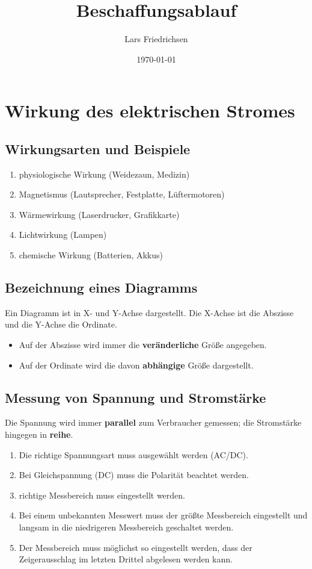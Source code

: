\documentclass[a4paper,11pt]{scrartcl}	%
\title{Beschaffungsablauf}
\author{Lars Friedrichsen}
\date{\today}
\begin{document}
\section{Wirkung des elektrischen Stromes}


	\subsection{Wirkungsarten und Beispiele}

		\begin{enumerate}
			\item physiologische Wirkung (Weidezaun, Medizin)
			\item Magnetismus (Lautsprecher, Festplatte, Lüftermotoren)
			\item Wärmewirkung (Laserdrucker, Grafikkarte)
			\item Lichtwirkung (Lampen)
			\item chemische Wirkung (Batterien, Akkus)
		\end{enumerate}
			
	\subsection{Bezeichnung eines Diagramms}
	
	Ein Diagramm ist in X- und Y-Achse dargestellt. Die X-Achse ist die Abszisse und die Y-Achse die Ordinate.
		\begin{itemize}
			\item Auf der Abszisse wird immer die \textbf{veränderliche} Größe angegeben.
			\item Auf der Ordinate wird die davon \textbf{abhängige} Größe dargestellt.
		\end{itemize}
		
	\subsection{Messung von Spannung und Stromstärke}
	
	Die Spannung wird immer \textbf{parallel} zum Verbraucher gemessen; die Stromstärke hingegen in \textbf{reihe}.
		
		\begin{enumerate}
			\item{Die richtige Spannungsart muss ausgewählt werden (AC/DC).}
    		\item{Bei Gleichspannung (DC) muss die Polarität beachtet werden.}
    		\item{richtige Messbereich muss eingestellt werden.}
    		\item{Bei einem unbekannten Messwert muss der größte Messbereich eingestellt und langsam in die niedrigeren Messbereich geschaltet werden.}
    		\item{Der Messbereich muss möglichst so eingestellt werden, dass der Zeigerausschlag im letzten Drittel abgelesen werden kann.}
		\end{enumerate}
		
\end{document}
